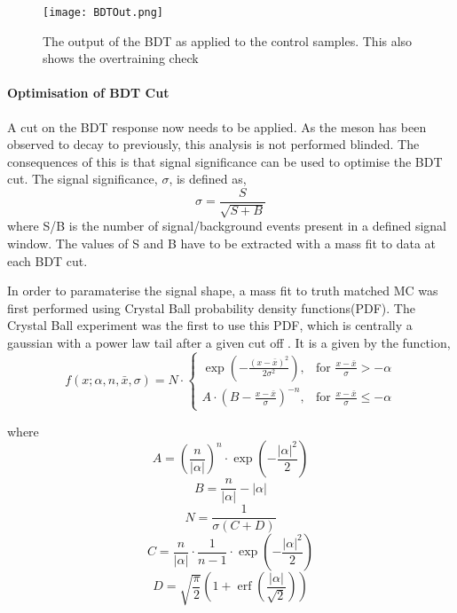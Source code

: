 \begin{figure}[h]
  \centering
  \texttt{[image: BDTOut.png]}
  \caption{The output of the BDT as applied to the control samples.  This also shows the overtraining check}
  \label{fig:BDTOut}
\end{figure}

\clearpage
\paragraph{Optimisation of BDT Cut}
A cut on the BDT response now needs to be applied.  As the \Bd meson has been observed to decay to \Kstar \etaz previously, this analysis is not performed blinded.  The consequences of this is that signal significance can be used to optimise the BDT cut.  The signal significance, $\sigma$, is defined as,
\begin{equation}
  \sigma=\frac{S}{\sqrt{S+B}}
\end{equation}
where S/B is the number of signal/background events present in a defined signal window.  The values of S and B have to be extracted with a mass fit to data at each BDT cut.

In order to paramaterise the signal shape, a mass fit to truth matched MC was first performed using Crystal Ball probability density functions(PDF).  The Crystal Ball experiment was the first to use this PDF, which is centrally a gaussian with a power law tail after a given cut off \cite{CrystallBall}.  It is a given by the function,
\begin{equation}
f(x;\alpha,n,\bar x,\sigma) = N \cdot \begin{cases} \exp(- \frac{(x - \bar x)^2}{2 \sigma^2}), & \mbox{for }\frac{x - \bar x}{\sigma} > -\alpha \\
  A \cdot (B - \frac{x - \bar x}{\sigma})^{-n}, & \mbox{for }\frac{x - \bar x}{\sigma} \leqslant -\alpha \end{cases}
\end{equation}

where
\begin{equation}
  A = \left(\frac{n}{\left| \alpha \right|}\right)^n \cdot \exp\left(- \frac {\left| \alpha \right|^2}{2}\right)
\end{equation}
\begin{equation}
  B = \frac{n}{\left| \alpha \right|}  - \left| \alpha \right|
\end{equation}
\begin{equation}
  N = \frac{1}{\sigma (C + D)}
\end{equation}
  \begin{equation}
  C = \frac{n}{\left| \alpha \right|} \cdot \frac{1}{n-1} \cdot \exp\left(- \frac {\left| \alpha \right|^2}{2}\right)
  \end{equation}
  \begin{equation}
  D = \sqrt{\frac{\pi}{2}} \left(1 + \operatorname{erf}\left(\frac{\left| \alpha \right|}{\sqrt 2}\right)\right)
  \end{equation}

